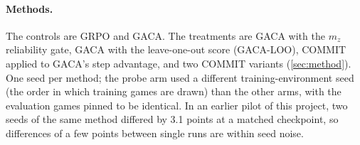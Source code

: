 \paragraph{Methods.}
The controls are GRPO and GACA. The treatments are GACA with the $m_z$ reliability gate, GACA with the
leave-one-out score (GACA-LOO), COMMIT applied to GACA's step advantage, and two COMMIT variants
(\cref{sec:method}). One seed per method; the probe arm used a different training-environment seed
(the order in which training games are drawn) than the other arms, with the evaluation games pinned to
be identical. In an earlier pilot of this project, two seeds of the same method differed by 3.1 points at a matched
checkpoint, so differences of a few points between single runs are within seed noise.
